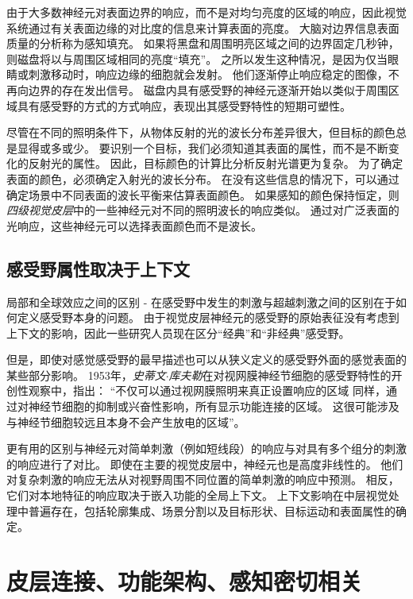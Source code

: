 由于大多数神经元对表面边界的响应，而不是对均匀亮度的区域的响应，因此视觉系统通过有关表面边缘的对比度的信息来计算表面的亮度。
大脑对边界信息表面质量的分析称为感知填充。
如果将黑盘和周围明亮区域之间的边界固定几秒钟，则磁盘将以与周围区域相同的亮度“填充”。
之所以发生这种情况，是因为仅当眼睛或刺激移动时，响应边缘的细胞就会发射。
他们逐渐停止响应稳定的图像，不再向边界的存在发出信号。
磁盘内具有感受野的神经元逐渐开始以类似于周围区域具有感受野的方式的方式响应，表现出其感受野特性的短期可塑性。


尽管在不同的照明条件下，从物体反射的光的波长分布差异很大，但目标的颜色总是显得或多或少。
要识别一个目标，我们必须知道其表面的属性，而不是不断变化的反射光的属性。
因此，目标颜色的计算比分析反射光谱更为复杂。
为了确定表面的颜色，必须确定入射光的波长分布。
在没有这些信息的情况下，可以通过确定场景中不同表面的波长平衡来估算表面颜色。
如果感知的颜色保持恒定，则\textit{四级视觉皮层}中的一些神经元对不同的照明波长的响应类似。
通过对广泛表面的光响应，这些神经元可以选择表面颜色而不是波长。



\subsection{感受野属性取决于上下文}

局部和全球效应之间的区别 - 在感受野中发生的刺激与超越刺激之间的区别在于如何定义感受野本身的问题。
由于视觉皮层神经元的感受野的原始表征没有考虑到上下文的影响，因此一些研究人员现在区分“经典”和“非经典”感受野。


但是，即使对感觉感受野的最早描述也可以从狭义定义的感受野外面的感觉表面的某些部分影响。
1953年，\textit{史蒂文$\cdot$库夫勒}在对视网膜神经节细胞的感受野特性的开创性观察中，指出：
“不仅可以通过视网膜照明来真正设置响应的区域 同样，通过对神经节细胞的抑制或兴奋性影响，所有显示功能连接的区域。
这很可能涉及与神经节细胞较远且本身不会产生放电的区域”。


更有用的区别与神经元对简单刺激（例如短线段）的响应与对具有多个组分的刺激的响应进行了对比。
即使在主要的视觉皮层中，神经元也是高度非线性的。
他们对复杂刺激的响应无法从对视野周围不同位置的简单刺激的响应中预测。
相反，它们对本地特征的响应取决于嵌入功能的全局上下文。
上下文影响在中层视觉处理中普遍存在，包括轮廓集成、场景分割以及目标形状、目标运动和表面属性的确定。



\section{皮层连接、功能架构、感知密切相关}

